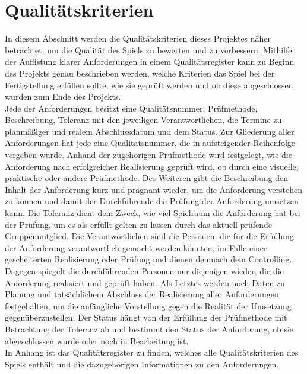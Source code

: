 \chapter{Qualitätskriterien}\label{ch:quality}
In diesem Abschnitt werden die Qualitätskriterien dieses Projektes näher betrachtet, um die Qualität des Spiels zu
bewerten und zu verbessern. 
Mithilfe der Auflistung klarer Anforderungen in einem Qualitätsregister kann zu Beginn des Projekts genau beschrieben
werden, welche Kriterien das Spiel bei der Fertigstellung erfüllen sollte, wie sie geprüft werden und 
ob diese abgeschlossen wurden zum Ende des Projekts.\\
\newline
Jede der Anforderungen besitzt eine Qualitätsnummer, Prüfmethode, Beschreibung, Toleranz mit den jeweiligen 
Verantwortlichen, die Termine zu planmäßiger und realem Abschlussdatum und dem Status.
Zur Gliederung aller Anforderungen hat jede eine Qualitätsnummer, die in aufsteigender Reihenfolge vergeben wurde.
Anhand der zugehörigen Prüfmethode wird festgelegt, wie die Anforderung nach erfolgreicher Realisierung geprüft wird, 
ob durch eine visuelle, praktische oder andere Prüfmethode.
Des Weiteren gibt die Beschreibung den Inhalt der Anforderung kurz und prägnant wieder, um die Anforderung verstehen 
zu können und damit der Durchführende die Prüfung der Anforderung umsetzen kann. 
Die Toleranz dient dem Zweck, wie viel Spielraum die Anforderung hat bei der Prüfung, um es als erfüllt gelten 
zu lassen durch das aktuell prüfende Gruppenmitglied.
Die Verantwortlichen sind die Personen, die für die Erfüllung der Anforderung verantwortlich gemacht werden könnten,
im Falle einer gescheiterten Realisierung oder Prüfung und dienen demnach dem Controlling.
Dagegen spiegelt die durchführenden Personen nur diejenigen wieder, die die Anforderung realisiert und geprüft haben.
Als Letztes werden noch Daten zu Planung und tatsächlichem Abschluss der Realisierung aller Anforderungen festgehalten,
um die anfängliche Vorstellung gegen die Realität der Umsetzung gegenüberzustellen.
Der Status hängt von der Erfüllung der Prüfmethode mit Betrachtung der Toleranz ab und bestimmt den Status der 
Anforderung, ob sie abgeschlossen wurde oder noch in Bearbeitung ist.\\
\newline
In Anhang %
ist das Qualitätsregister zu finden, welches alle Qualitätskriterien des Spiels
enthält und die dazugehörigen Informationen zu den Anforderungen.